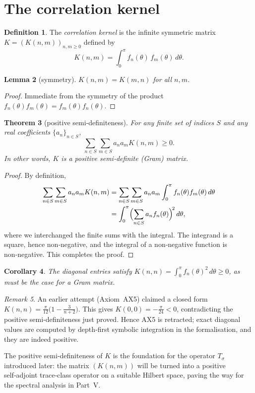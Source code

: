 \documentclass[11pt,a4paper]{article}
\newtheorem{theorem}{Theorem}[section]
\newtheorem{lemma}[theorem]{Lemma}
\newtheorem{corollary}[theorem]{Corollary}
\theoremstyle{definition}
\newtheorem{definition}[theorem]{Definition}
\theoremstyle{remark}
\newtheorem{remark}[theorem]{Remark}
\begin{document}
\section{The correlation kernel}

\begin{definition}
The \emph{correlation kernel} is the infinite symmetric matrix \(K=(K(n,m))_{n,m\ge 0}\) defined by
\begin{equation}\label{eq:K_def}
K(n,m) = \int_{0}^{\pi} f_n(\theta)\,f_m(\theta)\,d\theta.
\end{equation}
\end{definition}

\begin{lemma}[symmetry]\label{lem:sym}
\(K(n,m) = K(m,n)\) for all \(n,m\).
\end{lemma}
\begin{proof}
Immediate from the symmetry of the product \(f_n(\theta)f_m(\theta)=f_m(\theta)f_n(\theta)\).
\end{proof}

\begin{theorem}[positive semi‑definiteness]\label{thm:psd}
For any finite set of indices \(S\) and any real coefficients \(\{a_n\}_{n\in S}\),
\[
\sum_{n\in S}\sum_{m\in S} a_n a_m K(n,m) \ge 0.
\]
In other words, \(K\) is a positive semi‑definite (Gram) matrix.
\end{theorem}
\begin{proof}
By definition,
\begin{align*}
\sum_{n\in S}\sum_{m\in S} a_n a_m K(n,m)
&= \sum_{n\in S}\sum_{m\in S} a_n a_m \int_{0}^{\pi} f_n(\theta)f_m(\theta)\,d\theta \\
&= \int_{0}^{\pi} \Bigl(\sum_{n\in S} a_n f_n(\theta)\Bigr)^{\!2}\,d\theta,
\end{align*}
where we interchanged the finite sums with the integral. The integrand is a square, hence non‑negative, and the integral of a non‑negative function is non‑negative. This completes the proof.
\end{proof}

\begin{corollary}
The diagonal entries satisfy \(K(n,n) = \int_0^\pi f_n(\theta)^2\,d\theta \ge 0\), as must be the case for a Gram matrix.
\end{corollary}

\begin{remark}
An earlier attempt (Axiom~AX5) claimed a closed form \(K(n,n)=\frac{\pi}{12}\bigl(1-\frac{3}{n+2}\bigr)\). This gives \(K(0,0)=-\frac{\pi}{24}<0\), contradicting the positive semi‑definiteness just proved. Hence AX5 is retracted; exact diagonal values are computed by depth‑first symbolic integration in the formalisation, and they are indeed positive.
\end{remark}

The positive semi‑definiteness of \(K\) is the foundation for the operator \(T_\sigma\) introduced later: the matrix \((K(n,m))\) will be turned into a positive self‑adjoint trace‑class operator on a suitable Hilbert space, paving the way for the spectral analysis in Part~V.
\end{document}
